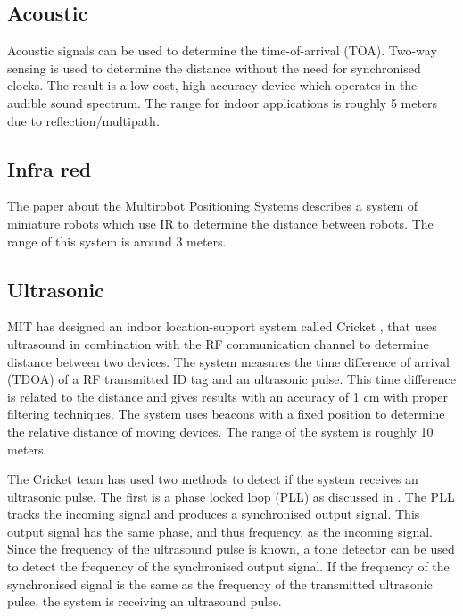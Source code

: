 \subsection*{Acoustic}

Acoustic signals \cite{Peng2007} can be used to determine the time-of-arrival (TOA). Two-way sensing is used to determine the distance without the need for synchronised clocks. The result is a low cost, high accuracy device which operates in the audible sound spectrum. The range for indoor applications is roughly 5 meters due to reflection/multipath.

\subsection*{Infra red}

The paper about the Multirobot Positioning Systems \cite{Pugh2009} describes a system of miniature robots which use IR to determine the distance between robots. The range of this system is around 3 meters.

\subsection*{Ultrasonic}
MIT has designed an indoor location-support system called Cricket \cite{Priyantha2000,Priyantha2005,Balakrishnan2003,Smith2005}, that uses ultrasound in combination with the RF communication channel to determine distance between two devices.
The system measures the time difference of arrival (TDOA) of a RF transmitted ID tag and an ultrasonic pulse.
This time difference is related to the distance and gives results with an accuracy of 1 cm with proper filtering techniques. The system uses beacons with a fixed position to determine the relative distance of moving devices.
The range of the system is roughly 10 meters.

The Cricket team has used two methods to detect if the system receives an ultrasonic pulse. The first is a phase locked loop (PLL) as discussed in \cite{Hsieh1996}.
The PLL tracks the incoming signal and produces a synchronised output signal.
This output signal has the same phase, and thus frequency, as the incoming signal.
Since the frequency of the ultrasound pulse is known, a tone detector can be used to detect the frequency of the synchronised output signal.
If the frequency of the synchronised signal is the same as the frequency of the transmitted ultrasonic pulse, the system is receiving an ultrasound pulse.

